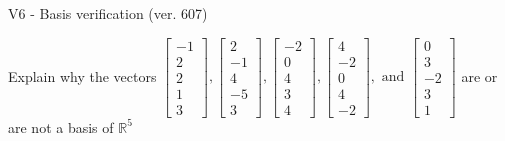 \begin{exercise}
  \begin{exerciseTitle}V6 - Basis verification (ver. 607)\end{exerciseTitle}
  \begin{exerciseStatement}
    Explain why the vectors \(\left[\begin{array}{r}
-1 \\
2 \\
2 \\
1 \\
3
\end{array}\right] , \left[\begin{array}{r}
2 \\
-1 \\
4 \\
-5 \\
3
\end{array}\right] , \left[\begin{array}{r}
-2 \\
0 \\
4 \\
3 \\
4
\end{array}\right] , \left[\begin{array}{r}
4 \\
-2 \\
0 \\
4 \\
-2
\end{array}\right] , \text{ and } \left[\begin{array}{r}
0 \\
3 \\
-2 \\
3 \\
1
\end{array}\right]\) are or are not a basis of \(\mathbb{R}^5\)	



\end{exerciseStatement}
\end{exercise}
